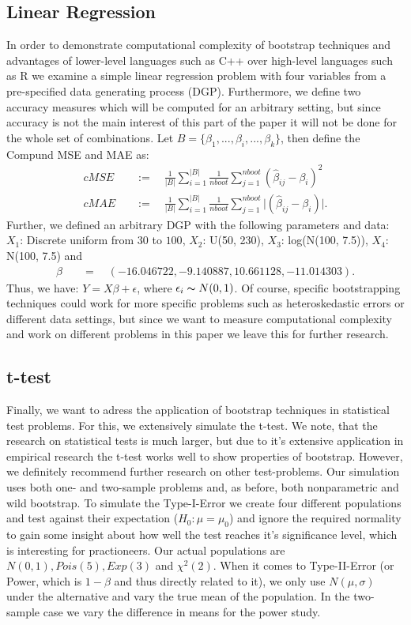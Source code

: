 \subsection{Linear Regression}
In order to demonstrate computational complexity of bootstrap techniques and advantages of lower-level languages such as C++ over high-level languages such as R we examine a simple linear regression problem with four variables from a pre-specified data generating process (DGP). Furthermore, we define two accuracy measures which will be computed for an arbitrary setting, but since accuracy is not the main interest of this part of the paper it will not be done for the whole set of combinations. Let $B  = \{\beta_1, ..., \beta_i, ..., \beta_k\}$, then define the Compund MSE and MAE as:
\begin{align*}
cMSE \quad &:= \quad \frac{1}{\lvert B \rvert} \sum_{i = 1}^{\lvert B \rvert} \frac{1}{nboot} \sum_{j = 1}^{nboot} (\hat{\beta}_{ij} - \beta_i)^2 \\
cMAE \quad &:= \quad \frac{1}{\lvert B \rvert} \sum_{i = 1}^{\lvert B \rvert} \frac{1}{nboot} \sum_{j = 1}^{nboot} \lvert (\hat{\beta}_{ij} - \beta_i) \rvert.
\end{align*}
Further, we defined an arbitrary DGP with the following parameters and data: $X_1$: Discrete uniform from $30$ to $100$, $X_2$: U(50, 230), $X_3$: log(N(100, 7.5)), $X_4$: N(100, 7.5) and \begin{align*}
\beta \quad  &= \quad (-16.046722, -9.140887, 10.661128, -11.014303).
\end{align*}
Thus, we have: $Y = X\beta + \epsilon$, where $\epsilon_i \thicksim N(0,1)$. Of course, specific bootstrapping techniques could work for more specific problems such as heteroskedastic errors or different data settings, but since we want to measure computational complexity and work on different problems in this paper we leave this for further research.

\subsection{t-test}
Finally, we want to adress the application of bootstrap techniques in statistical test problems. For this, we extensively simulate the t-test. We note, that the research on statistical tests is much larger, but due to it's extensive application in empirical research the t-test works well to show properties of bootstrap. However, we definitely recommend further research on other test-problems. Our simulation uses both one- and two-sample problems and, as before, both nonparametric and wild bootstrap. To simulate the Type-I-Error we create four different populations and test against their expectation ($H_0: \mu = \mu_0$) and ignore the required normality to gain some insight about how well the test reaches it's significance level, which is interesting for practioneers. Our actual populations are $N(0,1), Pois(5), Exp(3)$ and $\chi^2(2)$. When it comes to Type-II-Error (or Power, which is $1-\beta$ and thus directly related to it), we only use $N(\mu, \sigma)$ under the alternative and vary the true mean of the population. In the two-sample case we vary the difference in means for the power study. 